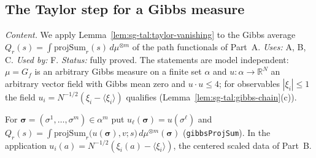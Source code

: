 \subsection{The Taylor step for a Gibbs measure}
\label{sec:sg-tal:fluct-gibbs-taylor}

\emph{Content.}  We apply Lemma~\ref{lem:sg-tal:taylor-vanishing} to the Gibbs average $Q_r(s)=\int\mathrm{projSum}_r(s)\,d\mu^{\otimes m}$ of the path functionals of Part~A.
\emph{Uses:} A, B, C.  \emph{Used by:} F.  \emph{Status:} fully proved.  The statements are model independent: $\mu=G_f$ is an arbitrary Gibbs measure on a finite set $\alpha$ and $u:\alpha\to\mathbb R^N$ an arbitrary vector field with Gibbs mean zero and $u\cdot u\le4$; for observables $|\xi_i|\le1$ the field $u_i=N^{-1/2}(\xi_i-\langle\xi_i\rangle)$ qualifies (Lemma~\ref{lem:sg-tal:gibbs-chain}(c)).

\begin{definition}
\label{def:sg-tal:gibbs-projsum}
  \leanok
{}
For $\boldsymbol\sigma=(\sigma^1,\dots,\sigma^m)\in\alpha^m$ put $u_\ell(\boldsymbol\sigma)=u(\sigma^\ell)$ and
$Q_r(s)=\int\mathrm{projSum}_r\bigl(u(\boldsymbol\sigma),v;s\bigr)\,d\mu^{\otimes m}(\boldsymbol\sigma)$ (\texttt{gibbsProjSum}).  In the application $u_i(a)=N^{-1/2}(\xi_i(a)-\langle\xi_i\rangle)$, the centered scaled data of Part~B.
\end{definition}

